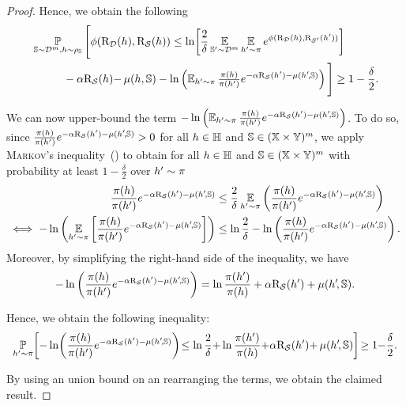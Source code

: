 \begin{noaddcontents}
\begin{proof}
Hence, we obtain the following 
\begin{align}
    &\operatorname*{\mathbb{P}}_{\mathbb{S}\sim\mathcal{D}^m,h\sim\rho_{\mathbb{S}}}\Bigg[ \phi(\text{R}_{\mathcal{D}}(h), \text{R}_{\mathcal{S}}(h)) \le \ln\!\left[\frac{2}{\delta}\operatorname*{\mathbb{E}}_{\mathbb{S}'\sim\mathcal{D}^m}\operatorname*{\mathbb{E}}_{h'\sim\pi}e^{\phi(\text{R}_{\mathcal{D}}(h), \text{R}_{\mathcal{S}'}(h'))}\right]\nonumber\\
    &\hspace{1cm}-\alpha\text{R}_{\mathcal{S}}(h){-}\operatorname{\mu}(h, \mathbb{S}) - \ln\left({\textstyle\operatorname*{\mathbb{E}}_{h'\sim\pi} \frac{\pi(h)}{\pi(h')}}e^{-\alpha\text{R}_{\mathcal{S}}(h')-\operatorname{\mu}(h'\!, \mathbb{S})}\right)\Bigg] \ge 1-\frac{\delta}{2}.\label{chap:pac-bayes:eq:proof-disintegrated-comp-1}
\end{align}

We can now upper-bound the term $- \ln\left({\textstyle\operatorname*{\mathbb{E}}_{h'\sim\pi} \frac{\pi(h)}{\pi(h')}}e^{-\alpha\text{R}_{\mathcal{S}}(h')-\operatorname{\mu}(h'\!, \mathbb{S})}\right)$.
To do so, since $\frac{\pi(h)}{\pi(h')}e^{-\alpha\text{R}_{\mathcal{S}}(h')-\operatorname{\mu}(h'\!, \mathbb{S})} > 0$ for all $h\in\mathbb{H}$ and $\mathbb{S}\in(\mathbb{X}\times\mathbb{Y})^{m}$, we apply \textsc{Markov}'s inequality~() to obtain for all $h\in\mathbb{H}$ and $\mathbb{S}\in(\mathbb{X}\times\mathbb{Y})^{m}$ with probability at least $1-\frac{\delta}{2}$ over $h'\sim\pi$
\begin{align*}
    \frac{\pi(h)}{\pi(h')}e^{-\alpha\text{R}_{\mathcal{S}}(h')-\operatorname{\mu}(h'\!, \mathbb{S})} &\le \frac{2}{\delta}\operatorname*{\mathbb{E}}_{h'\sim\pi}\left(\frac{\pi(h)}{\pi(h')}e^{-\alpha\text{R}_{\mathcal{S}}(h')-\operatorname{\mu}(h'\!, \mathbb{S})}\right)\\
    \iff  -\ln\left(\operatorname*{\mathbb{E}}_{h'\sim\pi}\left[\frac{\pi(h)}{\pi(h')}e^{-\alpha\text{R}_{\mathcal{S}}(h')-\operatorname{\mu}(h'\!, \mathbb{S})}\right]\right) &\le \ln\frac{2}{\delta} -\ln\left(\frac{\pi(h)}{\pi(h')}e^{-\alpha\text{R}_{\mathcal{S}}(h')-\operatorname{\mu}(h'\!, \mathbb{S})}\right).
\end{align*}
Moreover, by simplifying the right-hand side of the inequality, we have 
\begin{align*}
    -\ln\left(\frac{\pi(h)}{\pi(h')}e^{-\alpha\text{R}_{\mathcal{S}}(h')-\operatorname{\mu}(h'\!, \mathbb{S})}\right) = \ln\frac{\pi(h')}{\pi(h)} + \alpha\text{R}_{\mathcal{S}}(h')+\operatorname{\mu}(h'\!, \mathbb{S}).
\end{align*}

Hence, we obtain the following inequality:
\begin{align}
    \operatorname*{\mathbb{P}}_{h'\sim\pi}\!\left[ -\ln\!\left(\frac{\pi(h)}{\pi(h')}e^{-\alpha\text{R}_{\mathcal{S}}(h')-\operatorname{\mu}(h'\!, \mathbb{S})}\right) \!\le \ln\frac{2}{\delta}{+}\ln\frac{\pi(h')}{\pi(h)}{+}\alpha\text{R}_{\mathcal{S}}(h'){+}\operatorname{\mu}(h'\!, \mathbb{S}) \right]\! \ge 1{-}\frac{\delta}{2}.\label{chap:pac-bayes:eq:proof-disintegrated-comp-2}
\end{align}

By using an union bound on  an rearranging the terms, we obtain the claimed result.
\end{proof}


\end{noaddcontents}
